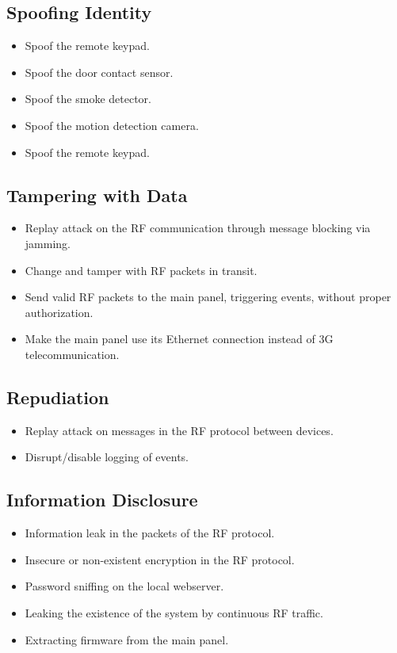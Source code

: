\subsection{Spoofing Identity}
\begin{itemize}
    \item Spoof the remote keypad.
    \item Spoof the door contact sensor.
    \item Spoof the smoke detector.
    \item Spoof the motion detection camera.
    \item Spoof the remote keypad.
\end{itemize}

\subsection{Tampering with Data}
\begin{itemize}
    \item Replay attack on the RF communication through message blocking via jamming.
    \item Change and tamper with RF packets in transit.
    \item Send valid RF packets to the main panel, triggering events, without proper authorization.
    \item Make the main panel use its Ethernet connection instead of 3G telecommunication.
\end{itemize}

\subsection{Repudiation}
\begin{itemize}
    \item Replay attack on messages in the RF protocol between devices.
    \item Disrupt/disable logging of events.
\end{itemize}

\subsection{Information Disclosure}
\begin{itemize}
    \item Information leak in the packets of the \gls{RF} protocol.
    \item Insecure or non-existent encryption in the \gls{RF} protocol.
    \item Password sniffing on the local webserver.
    \item Leaking the existence of the system by continuous RF traffic.
    \item Extracting firmware from the main panel.
\end{itemize}

